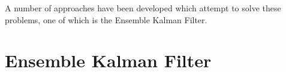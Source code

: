 A number of approaches have been developed which attempt to solve these
problems, one of which is the Ensemble Kalman Filter.




\section{Ensemble Kalman Filter}\label{sec:method:enkf}


